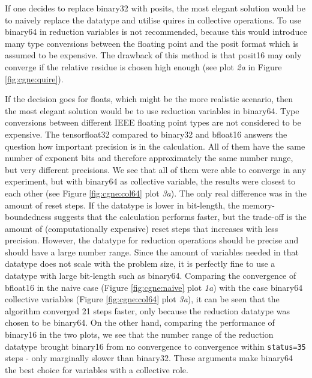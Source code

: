 \documentclass{article}
\theoremstyle{plain} %
\theoremstyle{convention} %
\theoremstyle{remark} %
\def\code#1{\texttt{#1}}
\numberwithin{equation}{section}
\begin{document}
If one decides to replace \gls{binary32} with posits, the most elegant solution would be to naively replace the datatype and utilise \glspl{quire} in collective operations. To use \gls{binary64} in reduction variables is not recommended, because this would introduce many type conversions between the floating point and the posit format which is assumed to be expensive. The drawback of this method is that \gls{posit16} may only converge if the relative residue is chosen high enough (see plot \textit{2a} in Figure \ref{fig:cgne:quire}).

If the decision goes for floats, which might be the more realistic scenario, then the most elegant solution would be to use reduction variables in \gls{binary64}. Type conversions between different IEEE floating point types are not considered to be expensive. The \gls{tensorfloat32} compared to \gls{binary32} and \gls{bfloat16} answers the question how important precision is in the calculation. All of them have the same number of exponent bits and therefore approximately the same number range, but very different precisions. We see that all of them were able to converge in any experiment, but with \gls{binary64} as collective variable, the results were closest to each other (see Figure \ref{fig:cgne:col64} plot \textit{3a}). The only real difference was in the amount of reset steps. If the datatype is lower in bit-length, the memory-boundedness suggests that the calculation performs faster, but the trade-off is the amount of (computationally expensive) reset steps that increases with less precision. However, the datatype for reduction operations should be precise and should have a large number range. Since the amount of variables needed in that datatype does not scale with the problem size, it is perfectly fine to use a datatype with large bit-length such as \gls{binary64}. Comparing the convergence of \gls{bfloat16} in the naive case (Figure \ref{fig:cgne:naive} plot \textit{1a}) with the case \gls{binary64} collective variables (Figure \ref{fig:cgne:col64} plot \textit{3a}), it can be seen that the algorithm converged \num{21} steps faster, only because the reduction datatype was chosen to be \gls{binary64}. On the other hand, comparing the performance of \gls{binary16} in the two plots, we see that the number range of the reduction datatype brought \gls{binary16} from no convergence to convergence within \code{status=35} steps - only marginally slower than \gls{binary32}. These arguments make \gls{binary64} the best choice for variables with a collective role.
\end{document}
